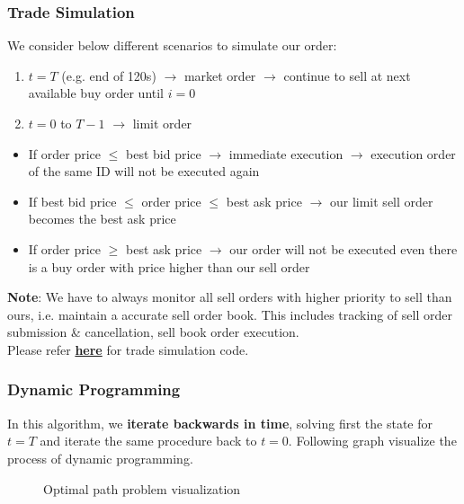 \documentclass[12pt]{extarticle}
\begin{document}
\subsubsection{Trade Simulation}
We consider below different scenarios to simulate our order:
\begin{enumerate}
 \item $t = T$ (e.g. end of 120s) $\rightarrow$ market order $\rightarrow$ continue to sell at next available buy order until $i=0$
 \item $t = 0$ to $T-1$ $\rightarrow$ limit order
\end{enumerate}
 \begin{itemize}
 \item If order price $\leqslant$ best bid price $\rightarrow$ immediate execution $\rightarrow$ execution order of the same ID will not be executed again
 \item If best bid price $\leqslant$ order price $\leqslant$ best ask price $\rightarrow$ our limit sell order becomes the best ask price
 \item If order price $\geqslant$ best ask price $\rightarrow$ our order will not be executed even there is a buy order with price higher than our sell order
 \end{itemize}
\textbf{Note}: We have to always monitor all sell orders with higher priority to sell than ours, i.e. maintain a accurate sell order book. This includes tracking of sell order submission \& cancellation, sell book order execution.
\\Please refer \href{https://github.com/wangkunzhen/Machine-Learning-5225/blob/master/ExecutionEngine.py}{\textbf{here}} for trade simulation code.

\subsubsection{Dynamic Programming}

In this algorithm, we \textbf{iterate backwards in time}, solving first the state for $t = T$ and iterate the same procedure back to $t = 0$. Following graph visualize the process of dynamic programming.

\begin{figure}[H]
\caption{Optimal path problem visualization}
\end{figure}
\end{document}
